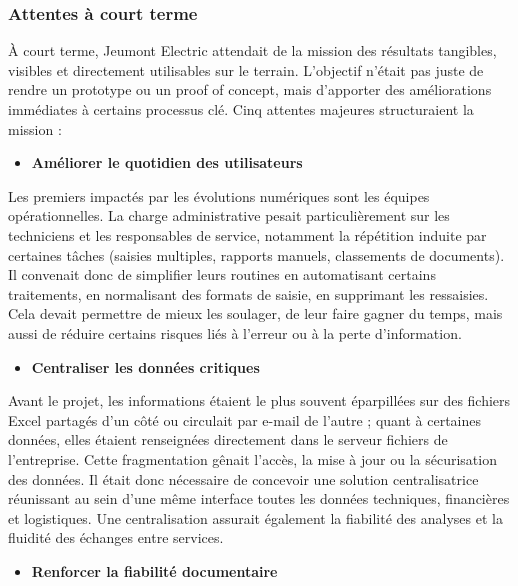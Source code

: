 \documentclass[11pt,a4paper]{article}
\begin{document}
\subsubsection{Attentes à court terme}

À court terme, Jeumont Electric attendait de la mission des résultats tangibles, visibles et directement utilisables sur le terrain. L’objectif n’était pas juste de rendre un prototype ou un proof of concept, mais d’apporter des améliorations immédiates à certains processus clé. Cinq attentes majeures structuraient la mission :

\begin{itemize}
	\item \textbf{Améliorer le quotidien des utilisateurs  }
\end{itemize}
Les premiers impactés par les évolutions numériques sont les équipes opérationnelles. La charge administrative pesait particulièrement sur les techniciens et les responsables de service, notamment la répétition induite par certaines tâches (saisies multiples, rapports manuels, classements de documents). Il convenait donc de simplifier leurs routines en automatisant certains traitements, en normalisant des formats de saisie, en supprimant les ressaisies. Cela devait permettre de mieux les soulager, de leur faire gagner du temps, mais aussi de réduire certains risques liés à l’erreur ou à la perte d’information.

\begin{itemize}
\item \textbf{Centraliser les données critiques  } \
\end{itemize}

Avant le projet, les informations étaient le plus souvent éparpillées sur des fichiers Excel partagés d’un côté ou circulait par e-mail de l’autre ; quant à certaines données, elles étaient renseignées directement dans le serveur fichiers de l’entreprise. Cette fragmentation gênait l’accès, la mise à jour ou la sécurisation des données. Il était donc nécessaire de concevoir une solution centralisatrice réunissant au sein d’une même interface toutes les données techniques, financières et logistiques. Une centralisation assurait également la fiabilité des analyses et la fluidité des échanges entre services.

\begin{itemize}
\item \textbf{Renforcer la fiabilité documentaire } \
\end{itemize}
\end{document}
